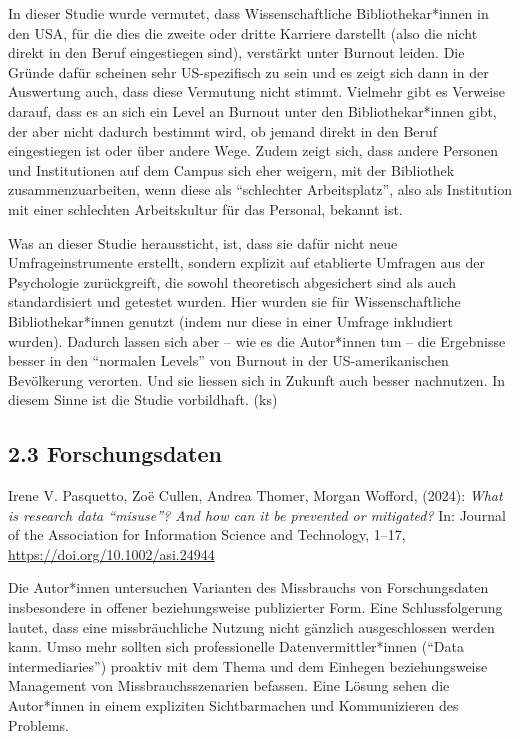 \documentclass[a4paper,
fontsize=11pt,
oneside,
numbers=noperiodatend,
parskip=half-,
bibliography=totoc,
final
]{scrartcl}
\begin{document}
In dieser Studie wurde vermutet, dass Wissenschaftliche
Bibliothekar*innen in den USA, für die dies die zweite oder dritte
Karriere darstellt (also die nicht direkt in den Beruf eingestiegen
sind), verstärkt unter Burnout leiden. Die Gründe dafür scheinen sehr
US-spezifisch zu sein und es zeigt sich dann in der Auswertung auch,
dass diese Vermutung nicht stimmt. Vielmehr gibt es Verweise darauf,
dass es an sich ein Level an Burnout unter den Bibliothekar*innen gibt,
der aber nicht dadurch bestimmt wird, ob jemand direkt in den Beruf
eingestiegen ist oder über andere Wege. Zudem zeigt sich, dass andere
Personen und Institutionen auf dem Campus sich eher weigern, mit der
Bibliothek zusammenzuarbeiten, wenn diese als ``schlechter
Arbeitsplatz'', also als Institution mit einer schlechten Arbeitskultur
für das Personal, bekannt ist.

Was an dieser Studie heraussticht, ist, dass sie dafür nicht neue
Umfrageinstrumente erstellt, sondern explizit auf etablierte Umfragen
aus der Psychologie zurückgreift, die sowohl theoretisch abgesichert
sind als auch standardisiert und getestet wurden. Hier wurden sie für
Wissenschaftliche Bibliothekar*innen genutzt (indem nur diese in einer
Umfrage inkludiert wurden). Dadurch lassen sich aber -- wie es die
Autor*innen tun -- die Ergebnisse besser in den ``normalen Levels'' von
Burnout in der US-amerikanischen Bevölkerung verorten. Und sie liessen
sich in Zukunft auch besser nachnutzen. In diesem Sinne ist die Studie
vorbildhaft. (ks)

\subsection{2.3 Forschungsdaten}\label{forschungsdaten}

Irene V. Pasquetto, Zoë Cullen, Andrea Thomer, Morgan Wofford, (2024):
\emph{What is research data ``misuse''? And how can it be prevented or
mitigated?} In: Journal of the Association for Information Science and
Technology, 1--17, \url{https://doi.org/10.1002/asi.24944}

Die Autor*innen untersuchen Varianten des Missbrauchs von
Forschungsdaten insbesondere in offener beziehungsweise publizierter
Form. Eine Schlussfolgerung lautet, dass eine missbräuchliche Nutzung
nicht gänzlich ausgeschlossen werden kann. Umso mehr sollten sich
professionelle Datenvermittler*innen (``Data intermediaries'') proaktiv
mit dem Thema und dem Einhegen beziehungsweise Management von
Missbrauchsszenarien befassen. Eine Lösung sehen die Autor*innen in
einem expliziten Sichtbarmachen und Kommunizieren des Problems.
\end{document}
